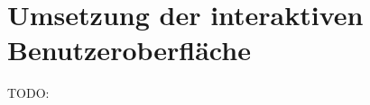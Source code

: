 \chapter{Umsetzung der interaktiven Benutzeroberfläche}
\label{chapter:umsetzung-der-interaktiven-benutzeroberfläche}

TODO:

